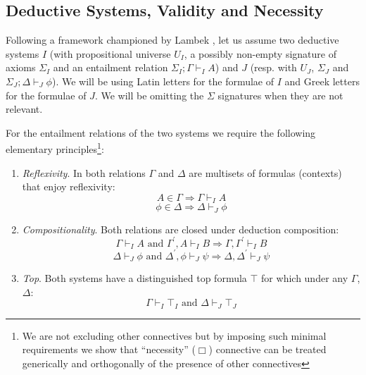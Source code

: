 \subsection{Deductive Systems, Validity and Necessity}
Following a framework championed by Lambek \cite{Lambek1968,Lambek1969}, let us  assume two deductive systems $I$ 
(with propositional universe $U_I$, 
a possibly non-empty signature of axioms $\Sigma_I$ and an entailment relation $\Sigma_I;\Gamma\vdash_{I}A$) and $J$ 
(resp. with  $U_J$, $\Sigma_J$ and $\Sigma_J;\Delta\vdash_J \phi$). We will be using Latin letters for the formulae of $I$ and Greek letters for the formulae of $J$.
We will be omitting the $\Sigma$ signatures when they are not relevant.

For the  entailment relations of the two systems we require the following elementary principles\footnote{We are not excluding other connectives but by imposing
such minimal requirements we show that ``necessity'' ($\Box$) connective can be treated generically and orthogonally of the presence of other connectives}:
\begin{enumerate}
	\item \textit{Reflexivity}. In both relations $\Gamma$ and $\Delta$ are multisets of formulas (contexts) that enjoy reflexivity:
	$$A \in \Gamma \Longrightarrow \Gamma\vdash_{I}A$$ $$\phi \in \Delta \Longrightarrow \Delta\vdash_{J}\phi$$
	\item \textit{Compositionality}.  Both relations are closed under deduction composition:  
	$$\Gamma\vdash_I A \text{\ and\ } \Gamma^{'},A\vdash_{I} B \Longrightarrow \Gamma,\Gamma^{'}\vdash_I B $$  
	$$\Delta\vdash_J\phi \text{\ and\ } \Delta^{'},\phi\vdash_{J} \psi \Longrightarrow \Delta,\Delta^{'}\vdash_J \psi$$ 
	\item \textit{Top}. Both systems have a distinguished top formula $\top$ for which under any $\Gamma$, $\Delta$: $$\Gamma\vdash_{I}\top_I \text{\ and \ }
	\Delta \vdash_J\top_J$$
\end{enumerate}

